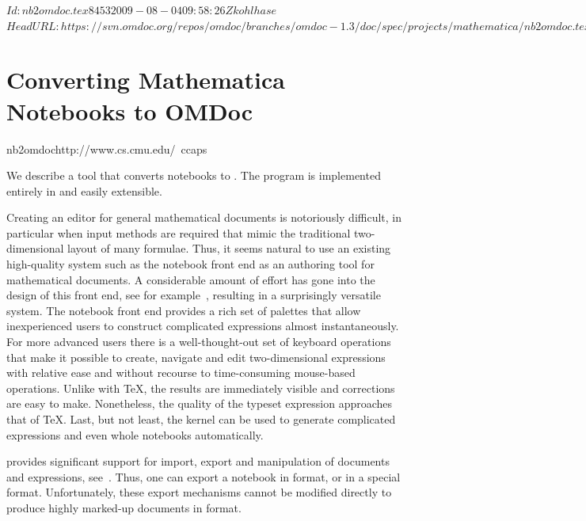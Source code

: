 \svnInfo $Id: nb2omdoc.tex 8453 2009-08-04 09:58:26Z kohlhase $
\svnKeyword $HeadURL: https://svn.omdoc.org/repos/omdoc/branches/omdoc-1.3/doc/spec/projects/mathematica/nb2omdoc.tex $
\def\nb2om{\scsys{nb2omdoc}}

\section{Converting Mathematica Notebooks to OMDoc}
\begin{project}{nb2omdoc}{http://www.cs.cmu.edu/~ccaps}
\end{project}

We describe a tool that converts {\mathematica} notebooks to {\omdoc}.  The program is
implemented entirely in {\mathematica} and easily extensible.

Creating an editor for general mathematical documents is notoriously difficult, in
particular when input methods are required that mimic the traditional two-dimensional
layout of many formulae.  Thus, it seems natural to use an existing high-quality system
such as the {\mathematica} notebook front end as an authoring tool for mathematical
documents.  A considerable amount of effort has gone into the design of this front end, see
for example~\cite{Wolfram00:mathnotation}, resulting in a surprisingly versatile system.
The notebook front end provides a rich set of palettes that allow inexperienced users to
construct complicated expressions almost instantaneously.  For more advanced users there
is a well-thought-out set of keyboard operations that make it possible to create, navigate
and edit two-dimensional expressions with relative ease and without recourse to
time-consuming mouse-based operations.  Unlike with {\TeX}, the results are immediately
visible and corrections are easy to make.  Nonetheless, the quality of the typeset
expression approaches that of {\TeX}.  Last, but not least, the {\mathematica} kernel can
be used to generate complicated expressions and even whole notebooks automatically.

{\mathematica} provides significant support for import, export and manipulation of {\xml}
documents and expressions, see~\cite{Wolfram.02}.  Thus, one can export a notebook in
{\mathml} format, or in a special {} format.  Unfortunately, these
export mechanisms cannot be modified directly to produce highly marked-up documents in
{\omdoc} format.

